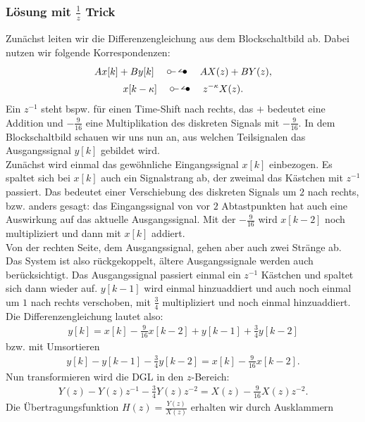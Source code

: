 \documentclass[11pt,a4paper,DIV=12]{scrartcl}
\begin{document}
\subsubsection{Lösung mit $\frac{1}{z}$ Trick}
Zunächst leiten wir die Differenzengleichung aus dem Blockschaltbild ab.
Dabei nutzen wir folgende Korrespondenzen:
%
%
%
\begin{gather}
	Ax[k]+By[k]\quad\ztransf\quad AX(z)+BY(z),\nonumber\\
	x[k-\kappa]\quad\ztransf\quad z^{-\kappa}X(z).\nonumber
\end{gather}
%
%
%
Ein $z^{-1}$ steht bspw. für einen Time-Shift nach rechts, das $+$ bedeutet
eine Addition und $-\frac{9}{16}$ eine Multiplikation des diskreten Signals mit
$-\frac{9}{16}$.
%
In dem Blockschaltbild schauen wir uns nun an, aus welchen Teilsignalen das
Ausgangssignal $y[k]$ gebildet wird.\\
%
Zunächst wird einmal das gewöhnliche Eingangssignal $x[k]$ einbezogen.
%
Es spaltet sich bei $x[k]$ auch ein Signalstrang ab, der zweimal das Kästchen
mit $z^{-1}$ passiert. Das bedeutet einer Verschiebung des diskreten Signals um
$2$ nach rechts, bzw. anders gesagt: das Eingangssignal von vor $2$
Abtastpunkten hat auch eine Auswirkung auf das aktuelle Ausgangssignal.
%
Mit der $-\frac{9}{16}$ wird $x[k-2]$ noch multipliziert und dann mit $x[k]$
addiert.\\
%
Von der rechten Seite, dem Ausgangssignal, gehen aber auch zwei Stränge ab.
%
Das System ist also rückgekoppelt, ältere Ausgangssignale werden auch
berücksichtigt.
%
Das Ausgangssignal passiert einmal ein $z^{-1}$ Kästchen und spaltet sich dann
wieder auf.
%
$y[k-1]$ wird einmal hinzuaddiert und auch noch einmal um $1$ nach rechts
verschoben, mit $\frac{3}{4}$ multipliziert und noch einmal hinzuaddiert.
%
Die Differenzengleichung lautet also:\label{pg:DGL}
%
%
%
\begin{gather}
	y[k] = x[k] - \frac{9}{16} x[k-2] + y[k-1] + \frac{3}{4} y[k-2]
\end{gather}
%
%
%
bzw. mit Umsortieren
%
%
%
\begin{gather}
	y[k] - y[k-1] - \frac{3}{4} y[k-2] = x[k] - \frac{9}{16} x[k-2].
\end{gather}
%
%
%
Nun transformieren wird die DGL in den $z$-Bereich:
%
%
%
\begin{gather}
	Y(z) - Y(z) z^{-1} - \frac{3}{4} Y(z) z^{-2} = X(z) - \frac{9}{16} X(z) z^{-2}.
\end{gather}
%
%
%
Die Übertragungsfunktion $H(z)=\frac{Y(z)}{X(z)}$ erhalten wir durch Ausklammern
\end{document}
